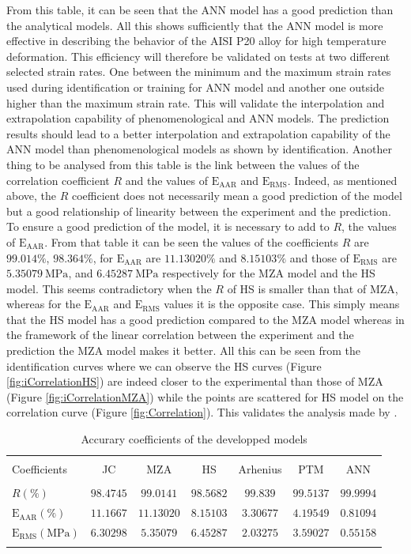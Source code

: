 \documentclass[twoside,english,1p,final,sort&compress]{elsarticle}
\theoremstyle{plain}
\newcommand{\RMSE}{\text{E}_\text{RMS}}
\newcommand{\AARE}{\text{E}_\text{AAR}}
\begin{document}
From this table, it can be seen that the ANN model has a good prediction than the analytical models.
All this shows sufficiently that the ANN model is more effective in describing the behavior of the AISI P20 alloy for high temperature deformation.
This efficiency will therefore be validated on tests at two different selected strain rates.
One between the minimum and the maximum strain rates used during identification or training for ANN model and another one outside higher than the maximum strain rate.
This will validate the interpolation and extrapolation capability of phenomenological and ANN models.
The prediction results should lead to a better interpolation and extrapolation capability of the ANN model than phenomenological models as shown by identification.
Another thing to be analysed from this table is the link between the values of the correlation coefficient $R$ and the values of $\AARE$ and $\RMSE$.
Indeed, as mentioned above, the $R$ coefficient does not necessarily mean a good prediction of the model but a good relationship of linearity between the experiment and the prediction.
To ensure a good prediction of the model, it is necessary to add to $R$, the values of $\AARE$.
From that table it can be seen the values of the coefficients $R$ are $99.014\%$, $98.364\%$, for $\AARE$ are $11.13020\%$ and $8.15103\%$ and those of $\RMSE$ are $5.35079\ \text{MPa}$, and $6.45287\ \text{MPa}$ respectively for the MZA model and the HS model.
This seems contradictory when the $R$ of HS is smaller than that of MZA, whereas for the $\AARE$ and $\RMSE$ values it is the opposite case.
This simply means that the HS model has a good prediction compared to the MZA model whereas in the framework of the linear correlation between the experiment and the prediction the MZA model makes it better.
All this can be seen from the identification curves where we can observe the HS curves (Figure \ref{fig:iCorrelationHS}) are indeed closer to the experimental than those of MZA (Figure \ref{fig:iCorrelationMZA}) while the points are scattered for HS model on the correlation curve (Figure \ref{fig:Correlation}).
This validates the analysis made by \cite{Phaniraj-2003, Srinivasulu-2006}.

\begin{table}[h!]
\centering{}
\caption{Accurary coefficients of the developped models}
\begin{tabular}{lcccccc}
\hline
&		&		&         &             &		   &		  		\\
Coefficients&JC  & MZA  &HS  & Arhenius      & PTM  &ANN  		    \\
&				&				&         &             &		   &\\
\hline
$R(\%)$&$98.4745$&$99.0141$&$98.5682$&$99.839$& $99.5137$&$99.9994$ \\
$\AARE(\%)$&$11.1667$&$11.13020$&$8.15103$&$3.30677$&$4.19549$&$0.81094$   \\
$\RMSE(\text{MPa})$&$6.30298$&$5.35079$&$6.45287$&$2.03275$&$3.59027$&$0.55158$\\
\hline
\label{tab:Coefsparams}
\end{tabular}
\end{table}
\end{document}
